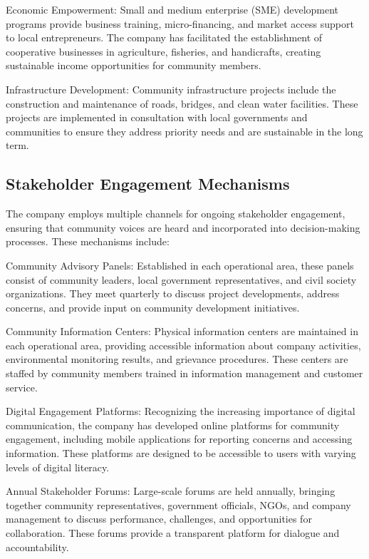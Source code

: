 Economic Empowerment: Small and medium enterprise (SME) development programs provide business training, micro-financing, and market access support to local entrepreneurs. The company has facilitated the establishment of cooperative businesses in agriculture, fisheries, and handicrafts, creating sustainable income opportunities for community members.

Infrastructure Development: Community infrastructure projects include the construction and maintenance of roads, bridges, and clean water facilities. These projects are implemented in consultation with local governments and communities to ensure they address priority needs and are sustainable in the long term.

\subsection{Stakeholder Engagement Mechanisms}

The company employs multiple channels for ongoing stakeholder engagement, ensuring that community voices are heard and incorporated into decision-making processes. These mechanisms include:

Community Advisory Panels: Established in each operational area, these panels consist of community leaders, local government representatives, and civil society organizations. They meet quarterly to discuss project developments, address concerns, and provide input on community development initiatives.

Community Information Centers: Physical information centers are maintained in each operational area, providing accessible information about company activities, environmental monitoring results, and grievance procedures. These centers are staffed by community members trained in information management and customer service.

Digital Engagement Platforms: Recognizing the increasing importance of digital communication, the company has developed online platforms for community engagement, including mobile applications for reporting concerns and accessing information. These platforms are designed to be accessible to users with varying levels of digital literacy.

Annual Stakeholder Forums: Large-scale forums are held annually, bringing together community representatives, government officials, NGOs, and company management to discuss performance, challenges, and opportunities for collaboration. These forums provide a transparent platform for dialogue and accountability.

